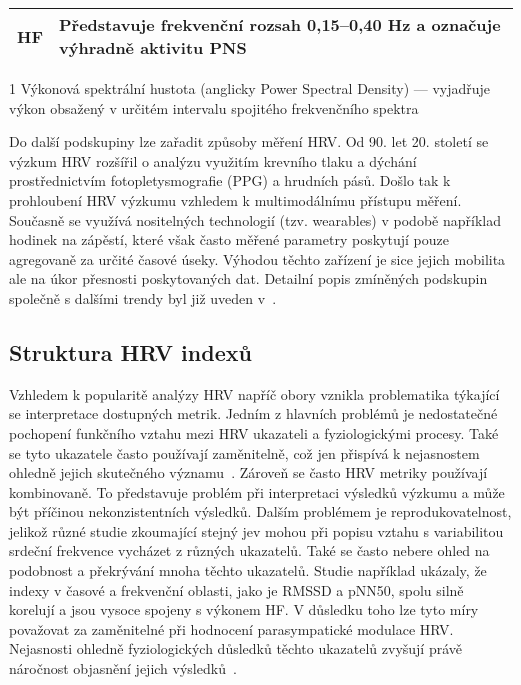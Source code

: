 \begin{table}[!htb]
\begin{threeparttable}
\begin{tabular}{p{2cm}p{12cm}}
            HF       & Představuje frekvenční rozsah 0,15--0,40 Hz a označuje výhradně aktivitu \gls{PNS}                                                                           \\ \bottomrule
        \end{tabular}
        \begin{tablenotes}
            \small
            \item [1] Výkonová spektrální hustota (anglicky Power Spectral
            Density) --- vyjadřuje výkon obsažený v určitém intervalu spojitého
            frekvenčního spektra
        \end{tablenotes}
    \end{threeparttable}
\end{table}

Do další podskupiny lze zařadit způsoby měření \gls{HRV}. Od 90. let 20. století
se výzkum \gls{HRV} rozšířil o analýzu využitím krevního tlaku a dýchání
prostřednictvím fotopletysmografie (\gls{PPG}) a hrudních pásů. Došlo tak k
prohloubení HRV výzkumu vzhledem k multimodálnímu přístupu měření. Současně se
využívá nositelných technologií (tzv. wearables) v podobě například hodinek na
zápěstí, které však často měřené parametry poskytují pouze agregovaně za určité
časové úseky. Výhodou těchto zařízení je sice jejich mobilita ale na úkor
přesnosti poskytovaných dat. Detailní popis zmíněných podskupin společně s
dalšími trendy byl již uveden v~\cite{Ishaque2021}.

\subsection{Struktura HRV indexů}
\label{subsec:hrv_indices}
Vzhledem k popularitě analýzy \gls{HRV} napříč obory vznikla problematika
týkající se interpretace dostupných metrik. Jedním z hlavních problémů je
nedostatečné pochopení funkčního vztahu mezi \gls{HRV} ukazateli a
fyziologickými procesy. Také se tyto ukazatele často používají zaměnitelně, což
jen přispívá k nejasnostem ohledně jejich skutečného
významu~\cite{Fatisson2016,hayano2019}. Zároveň se často \gls{HRV} metriky
používají kombinovaně. To představuje problém při interpretaci výsledků výzkumu
a může být příčinou nekonzistentních výsledků. Dalším problémem je
reprodukovatelnost, jelikož různé studie zkoumající stejný jev mohou při popisu
vztahu s variabilitou srdeční frekvence vycházet z různých ukazatelů. Také se
často nebere ohled na podobnost a překrývání mnoha těchto ukazatelů. Studie
například ukázaly, že indexy v časové a frekvenční oblasti, jako je RMSSD a
pNN50, spolu silně korelují a jsou vysoce spojeny s výkonem HF. V důsledku toho
lze tyto míry považovat za zaměnitelné při hodnocení parasympatické modulace
\gls{HRV}. Nejasnosti ohledně fyziologických důsledků těchto ukazatelů zvyšují
právě náročnost objasnění jejich
výsledků~\cite{Bigger1989,Rohila2020,Malik1996,Ishaque2021}.

